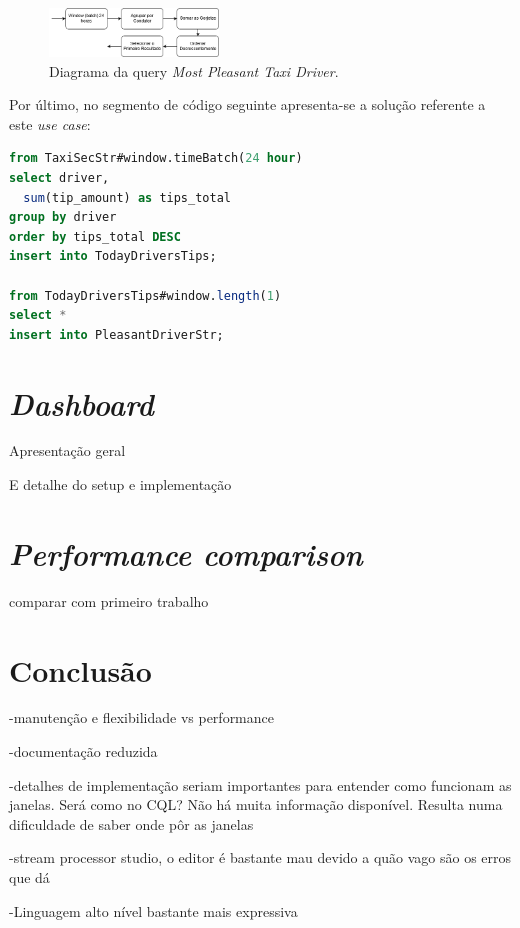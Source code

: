 \documentclass[article]{IEEEtran}
\begin{document}
\begin{figure}[hbtp]
    \centering
    \includegraphics[width=0.4\textwidth]{images/pleasantDriver}
    \caption{Diagrama da query \textit{Most Pleasant Taxi Driver}.}
    \label{fig:pleasantDriverDiagram}
\end{figure}



Por último, no segmento de código seguinte apresenta-se a solução referente a este \textit{use case}:

\begin{lstlisting}[language=SQL]
from TaxiSecStr#window.timeBatch(24 hour)
select driver, 
  sum(tip_amount) as tips_total
group by driver
order by tips_total DESC
insert into TodayDriversTips;

from TodayDriversTips#window.length(1)
select *
insert into PleasantDriverStr;
\end{lstlisting}

\section{\textit{Dashboard}} 
		Apresentação geral
		
		E detalhe do setup e implementação 
		
\section{\textit{Performance comparison}} 
comparar com primeiro trabalho
		
\section{Conclusão} 
-manutenção e flexibilidade vs performance

-documentação reduzida

-detalhes de implementação seriam importantes para entender como funcionam as janelas. Será como no CQL? Não há muita informação disponível. Resulta numa dificuldade de saber onde pôr as janelas

-stream processor studio, o editor é bastante mau devido a quão vago são os erros que dá

-Linguagem alto nível bastante mais expressiva







\end{document}
